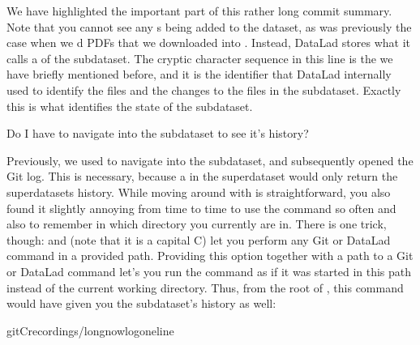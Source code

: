 \sphinxAtStartPar
We have highlighted the important part of this rather long commit summary.
Note that you cannot see any s being added to the dataset,
as was previously the case when we d PDFs that we
downloaded into . Instead,
DataLad stores what it calls a  of the subdataset.
The cryptic character sequence in this line is the {\hyperref[\detokenize{glossary:term-shasum}]{}} we have briefly
mentioned before, and it is the identifier that
DataLad internally used to identify the files and the changes to the files in the subdataset. Exactly this
{\hyperref[\detokenize{glossary:term-shasum}]{}} is what identifies the state of the subdataset.

\ignorespaces \begin{findoutmore}[label={fom-tmp-cwd}, before title={\thetcbcounter\ }, float, floatplacement=tb, check odd page=true]{Do I have to navigate into the subdataset to see it’s history?}
\label{\detokenize{basics/101-106-nesting:fom-tmp-cwd}}

\sphinxAtStartPar
Previously, we used  to navigate into the subdataset, and
subsequently opened the Git log. This is necessary, because a 
in the superdataset would only return the superdatasets history.
While moving around with  is straightforward, you also found it
slightly annoying from time to time to use the  command so often and also
to remember in which directory you currently are in. There is one
trick, though:  and  (note that it is a capital C) let you perform any
Git or DataLad command in a provided path. Providing this option together with a path to
a Git or DataLad command let’s you run the command as if it was started in this path
instead of the current working directory.
Thus, from the root of , this command would have given you the
subdataset’s history as well:

\begin{sphinxVerbatim}[commandchars=\\\{\}]
git\PYGZhy{}Crecordings/longnowlog\PYGZhy{}\PYGZhy{}oneline
\end{sphinxVerbatim}


\end{findoutmore}


